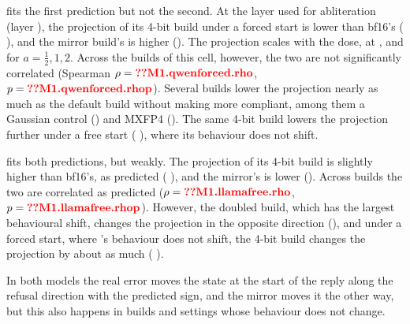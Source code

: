\qwen{} fits the first prediction but not the second. At the layer used for abliteration (layer ), the projection of its 4-bit build under a forced start is lower than bf16's ( ), and the mirror build's is higher (). The projection scales with the dose, at ,  and  for $a = \tfrac12, 1, 2$. Across the  builds of this cell, however, the two are not significantly correlated (Spearman $\rho=\N{M1.qwenforced.rho}$, $p=\N{M1.qwenforced.rhop}$). Several builds lower the projection nearly as much as the default build without making \qwen{} more compliant, among them a Gaussian control () and MXFP4 (). The same 4-bit build lowers the projection further under a free start ( ), where its behaviour does not shift.

\llama{} fits both predictions, but weakly. The projection of its 4-bit build is slightly higher than bf16's, as predicted ( ), and the mirror's is lower (). Across  builds the two are correlated as predicted ($\rho=\N{M1.llamafree.rho}$, $p=\N{M1.llamafree.rhop}$). However, the doubled build, which has the largest behavioural shift, changes the projection in the opposite direction (), and under a forced start, where \llama's behaviour does not shift, the 4-bit build changes the projection by about as much ( ).

In both models the real error moves the state at the start of the reply along the refusal direction with the predicted sign, and the mirror moves it the other way, but this also happens in builds and settings whose behaviour does not change.
